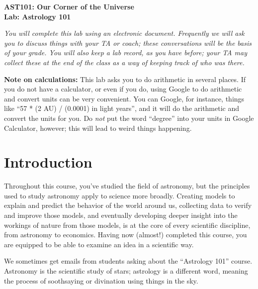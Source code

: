 \documentclass[11pt]{article}
\begin{document}
\begin{center}
\textbf{\Large
AST101: Our Corner of the Universe \\
\vspace*{0.1cm}
Lab: Astrology 101
}
\vspace{1em}


{\it You will complete this lab using an electronic document. Frequently we will ask you to discuss things with your TA or coach; these conversations will be the basis of your grade. You will also keep a lab record, as you have before; your TA may collect these at the end of the class as a way of keeping track of who was there.}

\end{center}

{\bf Note on calculations:} This lab asks you to do arithmetic in several places. If you do not have a calculator, or even if you do, using Google to do arithmetic and convert units can be very convenient. You can Google, for instance, things like ``57 * (2 AU) / (0.0001) in light years'', and it will do the arithmetic and convert the units for you. Do {\it not} put the word ``degree'' into your units in Google Calculator, however; this will lead to weird things happening.

\vspace*{0.5cm}



\section{Introduction}

Throughout this course, you've studied the field of astronomy, but the principles used to study astronomy apply to science more broadly. Creating models to explain and predict the behavior of the world around us, collecting data to verify and improve those models, and eventually developing deeper insight into the workings of nature from those models, is at the core of every scientific discipline, from astronomy to economics. Having now (almost!) completed this course, you are equipped to be able to examine an idea in a scientific way. 

We sometimes get emails from students asking about the ``Astrology 101'' course. Astronomy is the scientific study of stars; astrology is a different word, meaning the process of soothsaying or divination using things in the sky.
\end{document}
